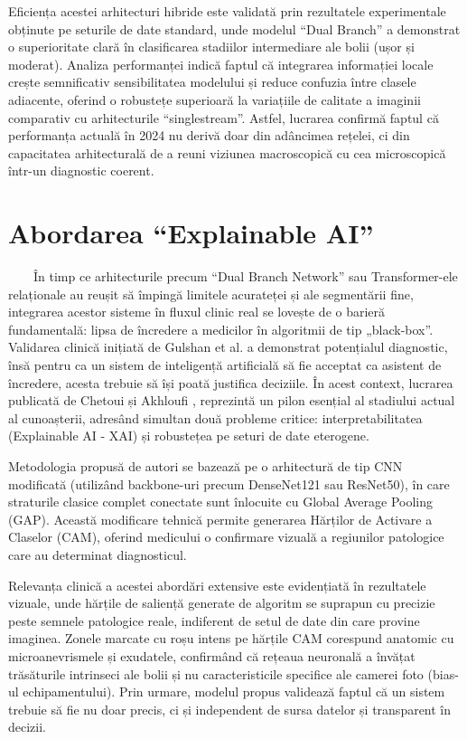 \documentclass[12pt, a4paper, oneside, romanian]{teza-upb}
\begin{document}
Eficiența acestei arhitecturi hibride este validată prin rezultatele experimentale obținute pe
seturile de date standard, unde modelul “Dual Branch” a demonstrat o superioritate clară în clasificarea
stadiilor intermediare ale bolii (ușor și moderat). Analiza performanței indică faptul că integrarea
informației locale crește semnificativ sensibilitatea modelului și reduce confuzia între clasele adiacente,
oferind o robustețe superioară la variațiile de calitate a imaginii comparativ cu arhitecturile “singlestream”. Astfel, lucrarea confirmă faptul că performanța actuală în 2024 nu derivă doar din adâncimea
rețelei, ci din capacitatea arhitecturală de a reuni viziunea macroscopică cu cea microscopică într-un
diagnostic coerent.

\section{Abordarea “Explainable AI” \cite{9_chetoui2020explainable}}

\ \ \ \ În timp ce arhitecturile precum “Dual Branch Network” \cite{11_shakibania2024dual} sau Transformer-ele relaționale \cite{7_huang2022rtnet}
au reușit să împingă limitele acurateței și ale segmentării fine, integrarea acestor sisteme în fluxul clinic
real se lovește de o barieră fundamentală: lipsa de încredere a medicilor în algoritmii de tip „black-box”.
Validarea clinică inițiată de Gulshan et al. \cite{3_gulshan2016development} a demonstrat potențialul diagnostic, însă pentru ca un
sistem de inteligență artificială să fie acceptat ca asistent de încredere, acesta trebuie să își poată
justifica deciziile. În acest context, lucrarea publicată de Chetoui și Akhloufi \cite{9_chetoui2020explainable}, reprezintă un pilon
esențial al stadiului actual al cunoașterii, adresând simultan două probleme critice: interpretabilitatea
(Explainable AI - XAI) și robustețea pe seturi de date eterogene.
\bigskip

Metodologia propusă de autori se bazează pe o arhitectură de tip CNN modificată (utilizând
backbone-uri precum DenseNet121 sau ResNet50), în care straturile clasice complet conectate sunt
înlocuite cu Global Average Pooling (GAP). Această modificare tehnică permite generarea Hărților de
Activare a Claselor (CAM), oferind medicului o confirmare vizuală a regiunilor patologice care au
determinat diagnosticul.
\bigskip

Relevanța clinică a acestei abordări extensive este evidențiată în rezultatele vizuale, unde hărțile
de saliență generate de algoritm se suprapun cu precizie peste semnele patologice reale, indiferent de
setul de date din care provine imaginea. Zonele marcate cu roșu intens pe hărțile CAM corespund
anatomic cu microanevrismele și exudatele, confirmând că rețeaua neuronală a învățat trăsăturile
intrinseci ale bolii și nu caracteristicile specifice ale camerei foto (bias-ul echipamentului). Prin urmare,
modelul propus \cite{9_chetoui2020explainable} validează faptul că un sistem trebuie să fie nu doar precis, ci și independent de sursa
datelor și transparent în decizii.
\end{document}
